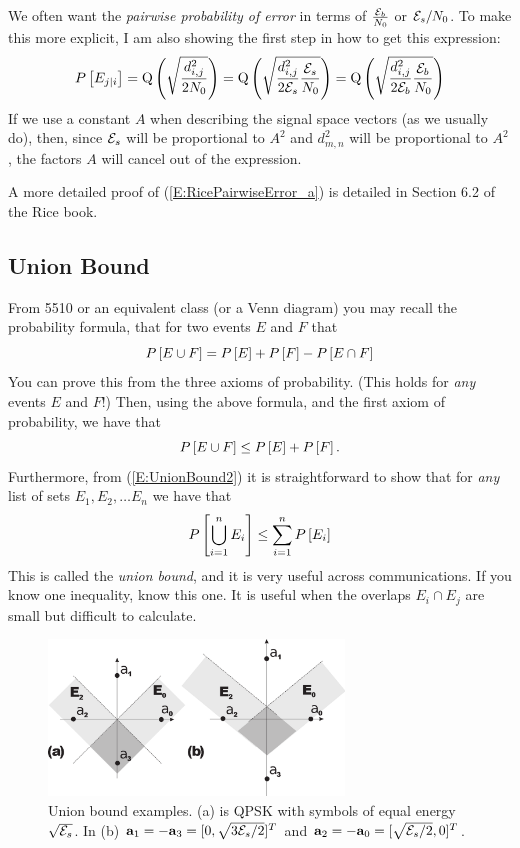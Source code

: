 We often want the  \emph{pairwise probability of error} in terms of $\frac{\mathcal{E}_b}{N_0}$ or $\mathcal{E}_s/N_0$.  To make this more explicit, I am also showing the first step in how to get this expression:
\begin{equation} \label{E:RicePairwiseError_a}
  P\left[{E_{j|i}}\right] = {\mbox{Q}\left( {\sqrt{\frac{d^2_{i,j}}{2N_0}}} \right)}
  = {\mbox{Q}\left( {\sqrt{\frac{d^2_{i,j}}{2\mathcal{E}_s}\frac{\mathcal{E}_s}{N_0}}} \right)}
  = {\mbox{Q}\left( {\sqrt{\frac{d^2_{i,j}}{2\mathcal{E}_b}\frac{\mathcal{E}_b}{N_0}}} \right)}
\end{equation}
If we use a constant $A$ when describing the signal space vectors (as we usually do), then, since $\mathcal{E}_s$ will be proportional to $A^2$ and $d^2_{m,n}$ will be proportional to $A^2$, the factors $A$ will cancel out of the expression.

A more detailed proof of (\ref{E:RicePairwiseError_a}) is detailed in Section 6.2 of the Rice book.





\subsection{Union Bound}

From 5510 or an equivalent class (or a Venn diagram) you may recall
the probability formula, that for two events $E$ and $F$ that
\[
  P\left[{E \cup F}\right] = P\left[{E}\right] + P\left[{F}\right] - P\left[{E \cap F}\right]
\]
You can prove this from the three axioms of probability. (This holds
for \emph{any} events $E$ and $F$!) Then, using the above formula,
and the first axiom of probability, we have that
\begin{equation} \label{E:UnionBound2}
  P\left[{E \cup F}\right] \le P\left[{E}\right] + P\left[{F}\right].
\end{equation}
Furthermore, from (\ref{E:UnionBound2}) it is straightforward to
show that for \emph{any} list of sets $E_1, E_2, \ldots E_n$ we have
that
\begin{equation} \label{E:UnionBound}
  P\left[{ \bigcup_{i=1}^n E_i }\right] \le \sum_{i=1}^n P\left[{E_i}\right]
\end{equation}
This is called the \emph{union bound}, and it is very useful across
communications.  If you know one inequality, know this one.  It is
useful when the overlaps $E_i \cap E_j$ are small but difficult to
calculate.  

\begin{figure}[htbp]
  \centerline{\includegraphics[width=0.7\textwidth]{../images/UnionBoundEg2.eps} }
  \caption{Union bound examples. (a) is QPSK with symbols of equal energy
    $\sqrt{\mathcal{E}_s}$.  In (b) $\mathbf{a}_1 = -\mathbf{a}_3 = [0, \sqrt{3\mathcal{E}_s/2}]^T$
    and $\mathbf{a}_2 = -\mathbf{a}_0 = [\sqrt{\mathcal{E}_s/2},0]^T$.  }
  \label{F:UnionBoundEg}
\end{figure}

